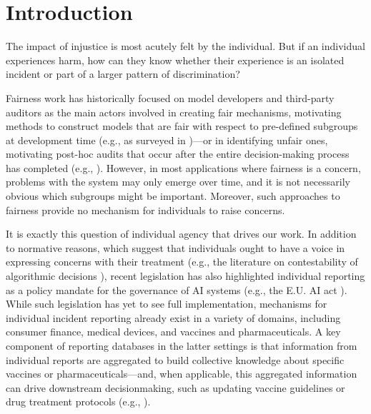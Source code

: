 \section{Introduction}

\iftoggle{icml}{}{
\begin{figure*}
\centering
    \texttt{[image: figs/overview\_jess.pdf]}
    \caption{Overview of incident database framework.}
    \label{fig:overview}
\end{figure*}
}
The impact of injustice is most acutely felt by the individual. But if an individual experiences harm, how can they know whether their experience is an isolated incident or part of a larger pattern of discrimination?

Fairness work has historically focused on model developers and third-party auditors as the main actors involved in creating fair mechanisms, motivating methods to construct models that are fair with respect to pre-defined subgroups at development time (e.g., as surveyed in \citet{pessach2022review})---or in identifying unfair ones, motivating post-hoc audits that occur after the entire decision-making process has completed (e.g., \citet{byun2024auditing, martinez2021secret}). 
However, in most applications where fairness is a concern, problems with the system may only emerge over time, and it is not necessarily obvious which subgroups might be important. Moreover, such approaches to fairness provide no mechanism for individuals to raise concerns. 
 
It is exactly this question of individual agency that drives our work. In addition to normative reasons, which suggest that individuals ought to have a voice in expressing concerns with their treatment (e.g., the literature on contestability of algorithmic decisions \citep{vaccaro2019contestability}), recent legislation has also highlighted individual reporting as a policy mandate for the governance of AI systems (e.g., the E.U. AI act \citep{EUAIAct2023}). While such legislation has yet to see full implementation,  mechanisms for individual incident reporting already exist in a variety of domains, including consumer finance, medical devices, and vaccines and pharmaceuticals. 
A key component of reporting databases in the latter settings is that information from individual reports are aggregated to build collective knowledge about specific vaccines or pharmaceuticals---and, when applicable, this aggregated information can drive downstream decisionmaking, such as updating vaccine guidelines or drug treatment protocols (e.g., \citet{oster2022myocarditis}). 

